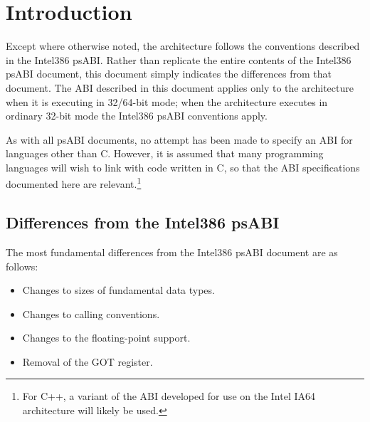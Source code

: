 
\chapter{Introduction}

Except where otherwise noted, the \xARCH architecture follows the
conventions described in the Intel386 psABI.  Rather than replicate
the entire contents of the Intel386 psABI document, this document
simply indicates the differences from that document.  The ABI
described in this document applies only to the \xARCH architecture
when it is executing in 32/64-bit mode; when the architecture executes
in ordinary 32-bit mode the Intel386 psABI conventions apply.

As with all psABI documents, no attempt has been made to specify an
ABI for languages other than C.  However, it is assumed that many
programming languages will wish to link with code written in C, so
that the ABI specifications documented here are relevant.\footnote{For
  C++, a variant of the ABI developed for use on the Intel IA64
  architecture will likely be used.}

\section{Differences from the Intel386 psABI}

The most fundamental differences from the Intel386 psABI document
are as follows:
\begin{itemize}
\item Changes to sizes of fundamental data types.
\item Changes to calling conventions.
\item Changes to the floating-point support.
\item Removal of the GOT register.
\end{itemize}

